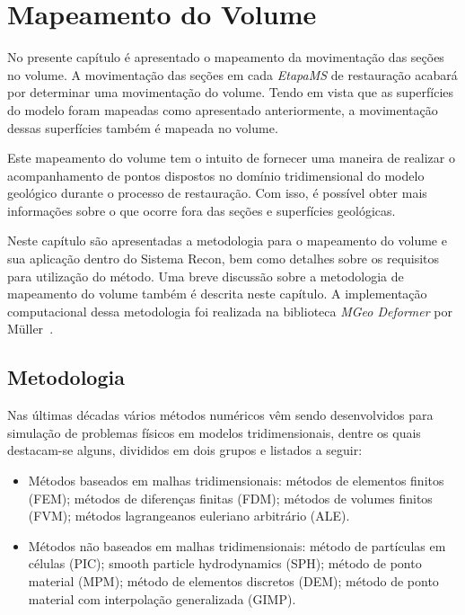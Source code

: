 
\chapter{Mapeamento do Volume}

No presente capítulo é apresentado o mapeamento da movimentação das seções no volume. A movimentação das seções em cada \emph{EtapaMS} de restauração acabará por determinar uma movimentação do volume. Tendo em vista que as superfícies do modelo foram mapeadas como apresentado anteriormente, a movimentação dessas superfícies também é mapeada no volume. 

Este mapeamento do volume tem o intuito de fornecer uma maneira de realizar o acompanhamento de pontos dispostos no domínio tridimensional do modelo geológico durante o processo de restauração. Com isso, é possível obter mais informações sobre o que ocorre fora das seções e superfícies geológicas.

Neste capítulo são apresentadas a metodologia para o mapeamento do volume e sua aplicação dentro do Sistema Recon, bem como detalhes sobre os requisitos para utilização do método. Uma breve discussão sobre a metodologia de mapeamento do volume também é descrita neste capítulo. A implementação computacional dessa metodologia foi realizada na biblioteca \emph{MGeo Deformer} por Müller~\cite{Muller}.

\section{Metodologia}\label{vol-metodology}

Nas últimas décadas vários métodos numéricos vêm sendo desenvolvidos para simulação de problemas físicos em modelos tridimensionais, dentre os quais destacam-se alguns, divididos em dois grupos e listados a seguir:

\renewcommand{\labelitemi}{•}
\begin{itemize}
  \item Métodos baseados em malhas tridimensionais: métodos de elementos finitos (FEM)\cite{MEF}; métodos de diferenças finitas (FDM)\cite{MDF}; métodos de volumes finitos (FVM)\cite{MVF}; métodos lagrangeanos euleriano arbitrário (ALE)\cite{ALE}.
  \item Métodos não baseados em malhas tridimensionais: método de partículas em células (PIC)\cite{PIC}; smooth particle hydrodynamics (SPH)\cite{SPH}; método de ponto material (MPM)\cite{MPM}; método de elementos discretos (DEM)\cite{DEM}; método de ponto material com interpolação generalizada (GIMP)\cite{GIMP,MullerGIMP}.
\end{itemize}

